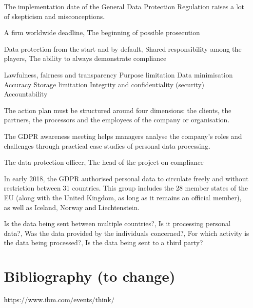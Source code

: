 \begin{itemize}
 \textbf{ }
The implementation date of the General Data Protection Regulation raises a lot of skepticism and misconceptions.

A firm worldwide deadline, The beginning of possible prosecution

Data protection from the start and by default, Shared responsibility among the players, The ability to always demonstrate compliance

Lawfulness, fairness and transparency
Purpose limitation
Data minimisation
Accuracy
Storage limitation
Integrity and confidentiality (security)
Accountability


The action plan must be structured around four dimensions: the clients, the partners, the processors and the employees of the company or organisation.

The GDPR awareness meeting helps managers analyse the company’s roles and challenges through practical case studies of personal data processing.

The data protection officer, The head of the project on compliance

In early 2018, the GDPR authorised personal data to circulate freely and without restriction between 31 countries. This group includes the 28 member states of the EU (along with the United Kingdom, as long as it remains an official member), as well as Iceland, Norway and Liechtenstein.


Is the data being sent between multiple countries?, Is it processing personal data?, Was the data provided by the individuals concerned?, For which activity is the data being processed?, Is the data being sent to a third party?

\section{Bibliography (to change)}
https://www.ibm.com/events/think/
\blindtext
\end{itemize}


